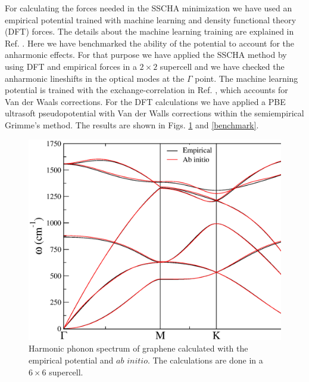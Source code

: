 For calculating the forces needed in the SSCHA minimization\cite{errea2014anharmonic} we have used an empirical 
potential trained with machine learning and density functional theory (DFT) forces. The details about the machine 
learning training are explained in Ref. \cite{rowe2018development}. Here we have benchmarked the ability of 
the potential to account for the anharmonic effects. For that purpose we have applied the SSCHA method by using 
DFT and empirical forces in a $2\times2$ supercell and we have checked the anharmonic lineshifts in the optical 
modes at the $\Gamma$ point. The machine learning potential is trained with the exchange-correlation in 
Ref. \cite{dion2004van}, which accounts for Van der Waals corrections. For the DFT calculations we have applied a 
PBE\cite{perdew1996generalized} ultrasoft pseudopotential\cite{vanderbilt1990soft} with Van der Walls 
corrections\cite{barone2009role} within the semiempirical Grimme's method. The 
results are shown in Figs. \ref{benchmark-spectrum} and \ref{benchmark}.
\begin{figure}[ht]
\includegraphics[width=0.99\linewidth]{Figures/abinito-vs-empirical.eps}
\caption[Harmonic phonon spectrum of graphene calculated with the empirical                                 
        potential and $ab$ $initio$.]{Harmonic phonon spectrum of graphene calculated with the empirical potential 
	and $ab$ $initio$. The calculations are done in a $6\times6$ supercell.}
\label{benchmark-spectrum}
\end{figure}
